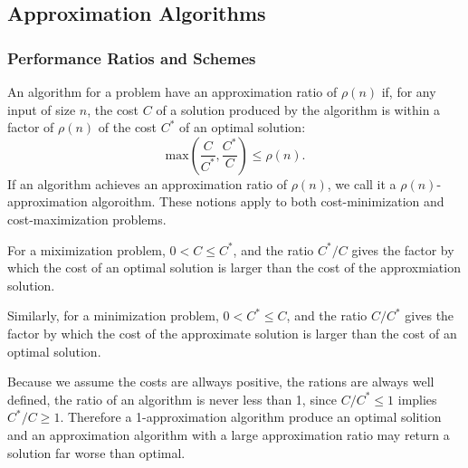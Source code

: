 \subsection{Approximation Algorithms}

\subsubsection{Performance Ratios and Schemes}
An algorithm for a problem have an approximation ratio of $\rho(n)$ if, for any
input of size $n$, the cost $C$ of a solution produced by the algorithm is
within a factor of $\rho(n)$ of the cost $C^*$ of an optimal solution:
\[
  \text{max}\left( \frac{C}{C^*}, \frac{C^*}{C} \right) \leq \rho(n).
\]
If an algorithm achieves an approximation ratio of $\rho(n)$, we call it a
$\rho(n)$-approximation algoroithm. These notions apply to both
cost-minimization and cost-maximization problems.

For a miximization problem, $0 < C \leq C^*$, and the ratio $C^*/C$ gives the
factor by which the cost of an optimal solution is larger than the cost of the
approxmiation solution.

Similarly, for a minimization problem, $0 < C^* \leq C$, and the ratio $C/C^*$
gives the factor by which the cost of the approximate solution is larger than
the cost of an optimal solution.

Because we assume the costs are allways positive, the rations are always well
defined, the ratio of an algorithm is never less than 1, since $C/C^* \leq 1$
implies $C^*/C \geq 1$. Therefore a 1-approximation algorithm produce an optimal
solition and an approximation algorithm with a large approximation ratio may
return a solution far worse than optimal.


